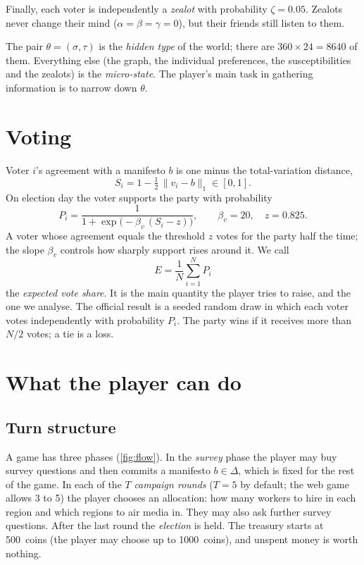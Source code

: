 \documentclass[11pt,a4paper,oneside]{report}
\newcommand{\coins}[1]{#1~coins}
\newcommand{\simplex}{\Delta}
\begin{document}
Finally, each voter is independently a \emph{zealot} with probability $\zeta = 0.05$. Zealots never change
their mind ($\alpha=\beta=\gamma=0$), but their friends still listen to them.

The pair $\theta = (\sigma,\tau)$ is the \emph{hidden type} of the world; there are $360 \times 24 = 8640$
of them. Everything else (the graph, the individual preferences, the susceptibilities and the zealots) is
the \emph{micro-state}. The player's main task in gathering information is to narrow down $\theta$.

\section{Voting}

Voter $i$'s agreement with a manifesto $b$ is one minus the total-variation distance,
\begin{equation}
  S_i = 1 - \tfrac12\,\lVert v_i - b \rVert_1 \in [0,1].
\end{equation}
On election day the voter supports the party with probability
\begin{equation}\label{eq:vote}
  P_i = \frac{1}{1+\exp\bigl(-\beta_v\,(S_i - z)\bigr)}, \qquad \beta_v = 20,\quad z = 0.825 .
\end{equation}
A voter whose agreement equals the threshold $z$ votes for the party half the time; the slope $\beta_v$
controls how sharply support rises around it. We call
\begin{equation}
  E = \frac{1}{N}\sum_{i=1}^{N} P_i
\end{equation}
the \emph{expected vote share}. It is the main quantity the player tries to raise, and the one we analyse.
The official result is a seeded random draw in which each voter votes independently with probability
$P_i$. The party wins if it receives more than $N/2$ votes; a tie is a loss.

\section{What the player can do}

\subsection{Turn structure}

A game has three phases (\cref{fig:flow}). In the \emph{survey} phase the player may buy survey questions
and then commits a manifesto $b \in \simplex$, which is fixed for the rest of the game. In each of the $T$
\emph{campaign rounds} ($T=5$ by default; the web game allows 3 to 5) the player chooses an allocation: how
many workers to hire in each region and which regions to air media in. They may also ask further survey
questions. After the last round the \emph{election} is held. The treasury starts at \coins{500} (the player
may choose up to \coins{1000}), and unspent money is worth nothing.
\end{document}
